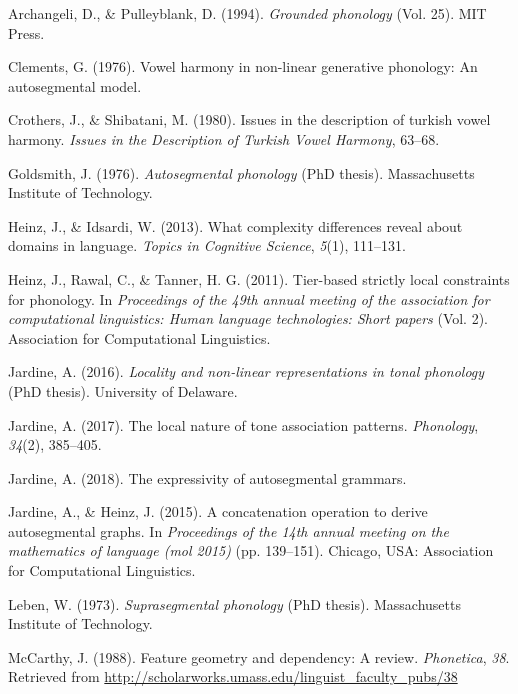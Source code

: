 \documentclass[floatsintext,man]{apa6}
\theoremstyle{definition}
\theoremstyle{definition}
\theoremstyle{definition}
\theoremstyle{remark}
\begin{document}
\setlength{\parindent}{-0.5in} \setlength{\leftskip}{0.5in}

\hypertarget{refs}{}
\hypertarget{ref-archangelipulleyblank1994}{}
Archangeli, D., \& Pulleyblank, D. (1994). \emph{Grounded phonology}
(Vol. 25). MIT Press.

\hypertarget{ref-Clements1976}{}
Clements, G. (1976). Vowel harmony in non-linear generative phonology:
An autosegmental model.

\hypertarget{ref-crothersshibatani1980}{}
Crothers, J., \& Shibatani, M. (1980). Issues in the description of
turkish vowel harmony. \emph{Issues in the Description of Turkish Vowel
Harmony}, 63--68.

\hypertarget{ref-Goldsmith1976}{}
Goldsmith, J. (1976). \emph{Autosegmental phonology} (PhD thesis).
Massachusetts Institute of Technology.

\hypertarget{ref-heinzidsardi2013}{}
Heinz, J., \& Idsardi, W. (2013). What complexity differences reveal
about domains in language. \emph{Topics in Cognitive Science},
\emph{5}(1), 111--131.

\hypertarget{ref-heinzetaltsl}{}
Heinz, J., Rawal, C., \& Tanner, H. G. (2011). Tier-based strictly local
constraints for phonology. In \emph{Proceedings of the 49th annual
meeting of the association for computational linguistics: Human language
technologies: Short papers} (Vol. 2). Association for Computational
Linguistics.

\hypertarget{ref-jardinediss}{}
Jardine, A. (2016). \emph{Locality and non-linear representations in
tonal phonology} (PhD thesis). University of Delaware.

\hypertarget{ref-jardinelocaltone}{}
Jardine, A. (2017). The local nature of tone association patterns.
\emph{Phonology}, \emph{34}(2), 385--405.

\hypertarget{ref-jardineexpressag}{}
Jardine, A. (2018). The expressivity of autosegmental grammars.

\hypertarget{ref-jardineheinz2015}{}
Jardine, A., \& Heinz, J. (2015). A concatenation operation to derive
autosegmental graphs. In \emph{Proceedings of the 14th annual meeting on
the mathematics of language (mol 2015)} (pp. 139--151). Chicago, USA:
Association for Computational Linguistics.

\hypertarget{ref-leben1973}{}
Leben, W. (1973). \emph{Suprasegmental phonology} (PhD thesis).
Massachusetts Institute of Technology.

\hypertarget{ref-mccarthyfg1988}{}
McCarthy, J. (1988). Feature geometry and dependency: A review.
\emph{Phonetica}, \emph{38}. Retrieved from
\url{http://scholarworks.umass.edu/linguist_faculty_pubs/38}
\end{document}
